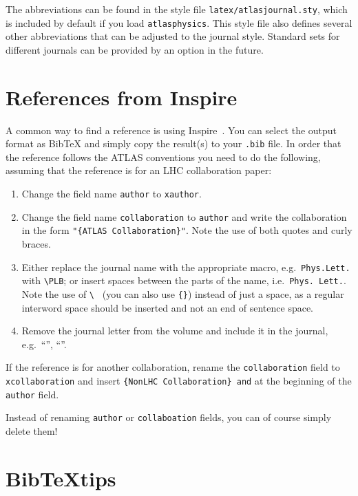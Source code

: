 \documentclass[UKenglish]{latex/atlasdoc}
\newcommand*{\BibTeX}{Bib\TeX}
\newcommand{\File}[1]{\texttt{#1}\xspace}
\newcommand{\Package}[1]{\texttt{#1}\xspace}
\begin{document}
The abbreviations can be found in the style file \File{latex/atlasjournal.sty},
which is included by default if you load \Package{atlasphysics}.
This style file also defines several other abbreviations that can be adjusted to the
journal style. 
Standard sets for different journals can be provided by an option in the future.

\section{References from Inspire}
\label{sc:inquire}

A common way to find a reference is using Inspire~\cite{inspire}.
You can select the output format as BibTeX and simply copy the result(s) to your \File{.bib} file.
In order that the reference follows the ATLAS conventions you need to do the following,
assuming that the reference is for an LHC collaboration paper:
\begin{enumerate}
\item Change the field name \texttt{author} to \texttt{xauthor}.
\item Change the field name \texttt{collaboration} to \texttt{author} and write the collaboration in the form
	\verb|"{ATLAS Collaboration}"|. Note the use of both quotes and curly braces.
\item Either replace the journal name with the appropriate macro, e.g.\ \texttt{Phys.Lett.} with
	\verb|\PLB|; or insert spaces between the parts of the name, i.e.\ \texttt{Phys.\ Lett.}.
	Note the use of \verb|\ | (you can also use \verb|{}|) instead of just a space, 
	as a regular interword space should be inserted and not an end of sentence space.
\item Remove the journal letter from the volume and include it in the journal, e.g.\ ``\EPJC'', ``\PRD''. 
\end{enumerate}
If the reference is for another collaboration, rename the \texttt{collaboration} field to
\texttt{xcollaboration} and insert \verb|{NonLHC Collaboration} and| at the beginning of the 
\texttt{author} field.

Instead of renaming \texttt{author} or \texttt{collaboation} fields, you can of course simply delete them!


\section{\BibTeX tips}
\end{document}
